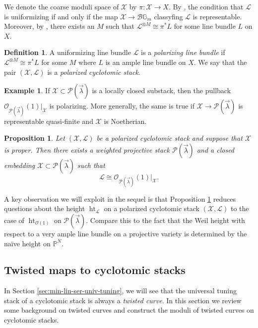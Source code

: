 \documentclass[a4paper,12pt]{amsart}
\newtheorem{prop}[thm]{Proposition}
\theoremstyle{definition}
\newtheorem{defn}[thm]{Definition}
\newtheorem{exmp}[thm]{Example}
\newcommand{\bG}{\mathbb{G}}
\newcommand{\cX}{\mathcal{X}}
\newcommand{\cO}{\mathcal{O}}
\newcommand{\cL}{\mathcal{L}}
\DeclareMathOperator{\height}{ht}
\newcommand{\Pcv}{\mathcal{P}(\vec{\lambda})}
\begin{document}
	We denote the coarse moduli space of $\cX$ by $\pi : \cX \to X$. By \cite[Prop. 2.3.10]{AH}, the condition that $\cL$ is uniformizing if and only if the map $\cX \to \mathcal{B} \bG_m$ classyfing $\cL$ is representable. Moreover, by \cite[Lem. 2.3.7]{AH}, there exists an $M$ such that $\cL^{\otimes M} \cong \pi^*L$ for some line bundle $L$ on $X$. 
	
	\begin{defn}
		A uniformizing line bundle $\cL$ is a \emph{polarizing line bundle} if $\cL^{\otimes M} \cong \pi^*L$ for some $M$ where $L$ is an ample line bundle on $X$. We say that the pair $(\cX, \cL)$ is a \emph{polarized cyclotomic stack}. 
	\end{defn}
	
	\begin{exmp}
		If $\cX \subset \Pcv$ is a locally closed substack, then the pullback $\mathcal{O}_{\Pcv}(1)|_{\cX}$ is polarizing. More generally, the same is true if $\cX \to \Pcv$ is representable quasi-finite and $\cX$ is Noetherian. 
	\end{exmp}
	
	\begin{prop}\cite[Prop. 2.4.2 \& 2.4.3, Corollary 2.4.4]{AH}\label{prop:polarizing:embedding} Let $(\cX,\cL)$ be a polarized cyclotomic stack and suppose that $\cX$ is proper. Then there exists a weighted projective stack $\Pcv$ and a closed embedding $\cX \subset \Pcv$ such that $$\cL \cong \cO_{\Pcv}(1)|_{\cX}.$$ 
	\end{prop}
	
	A key observation we will exploit in the sequel is that Proposition \ref{prop:polarizing:embedding} reduces questions about the height $\height_{\cL}$ on a polarized cyclotomic stack $(\cX,\cL)$ to the case of $\height_{\cO(1)}$ on $\Pcv$. Compare this to the fact that the Weil height with respect to a very ample line bundle on a projective variety is determined by the na\"ive height on $\mathbb{P}^N$. 
	
	\subsection{Twisted maps to cyclotomic stacks}
	\label{sec:mod-sp-twismaps}
	
	In Section \ref{sec:min-lin-ser-univ-tuning}, we will see that the universal tuning stack of a cyclotomic stack is always a \emph{twisted curve}. In this section we review some background on twisted curves and construct the moduli of twisted curves on cyclotomic stacks. 
	
\end{document}
